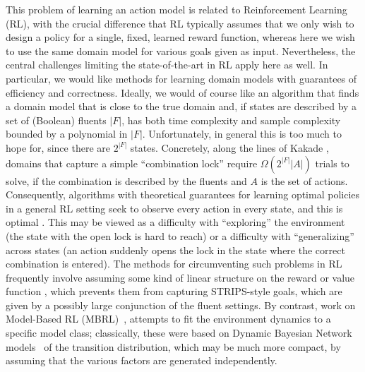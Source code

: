 \documentclass[letterpaper]{article} %
\begin{document}
This problem of learning an action model is related to Reinforcement Learning (RL), with the crucial difference that RL typically assumes that we only wish to design a policy for a single, fixed, learned reward function, whereas here we wish to use the same domain model for various goals given as input. %
Nevertheless, the central challenges limiting the state-of-the-art in RL apply here as well.
In particular, we would like methods for learning domain models with guarantees of efficiency and correctness. Ideally, we would of course like an algorithm that finds a domain model that is close to the true domain and, if states are described by a set of (Boolean) fluents $|F|$, has both time complexity and sample complexity bounded by a polynomial in $|F|$. Unfortunately, in general this is  too much to hope for, since there are $2^{|F|}$ states. Concretely, along the lines of Kakade , domains that capture a simple ``combination lock'' require $\Omega(2^{|F|}|A|)$ trials to solve, if the combination is described by the fluents and $A$ is the set of actions. Consequently, algorithms with theoretical guarantees for learning optimal policies in a general RL setting seek to observe every action in every state, and this is optimal \cite{strehl2006pac}. 
This may be viewed as a difficulty with ``exploring'' the environment (the state with the open lock is hard to reach) or a difficulty with ``generalizing'' across states (an action suddenly opens the lock in the state where the correct combination is entered). The methods for circumventing such problems in RL frequently involve assuming some kind of linear structure on the reward or value function \cite{osband2014,osband2016,jin2020,yang2019}, which prevents them from capturing STRIPS-style goals, which are given by a possibly large conjunction of the fluent settings. 
By contrast, work on Model-Based RL (MBRL)~\cite{kearns1999efficient,koller2000policy,strehl2007efficient,diuk2009adaptive}, attempts to fit the environment dynamics to a specific model class; classically, these were based on Dynamic Bayesian Network models~\cite{dean1989model} of the transition distribution, which may be much more compact, by assuming that the various factors are generated independently. 
\end{document}
